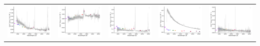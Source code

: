 \begin{center}
\begin{longtable}{l l l l l }
    \includegraphics[width=0.2\linewidth, clip]{Figs/Figs-sdss/spec-0983-52443-0348-STRIPE82-0104-019279.pdf} & \includegraphics[width=0.2\linewidth, clip]{Figs/Figs-sdss/spec-0983-52443-0459-STRIPE82-0106-052252.pdf} & \includegraphics[width=0.2\linewidth, clip]{Figs/Figs-sdss/spec-0984-52442-0311-STRIPE82-0105-069446.pdf} & \includegraphics[width=0.2\linewidth, clip]{Figs/Figs-sdss/spec-0984-52442-0533-STRIPE82-0108-039253.pdf} & \includegraphics[width=0.2\linewidth, clip]{Figs/Figs-sdss/spec-0990-52465-0605-STRIPE82-0124-071122.pdf} \\

\end{longtable}
\end{center}
